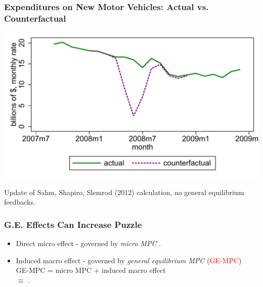 \documentclass[english,xcolor=svgnames]{beamer}
\begin{document}
\begin{frame}{}
\frametitle{Expenditures on New Motor Vehicles: Actual vs. Counterfactual}

\begin{center}
\includegraphics[scale=.6]{figures/fig_sss_mv_counter.pdf}
 \end{center} 
{\footnotesize Update of Sahm, Shapiro, Slemrod (2012) calculation, no general equilibrium feedbacks.}
\end{frame}

\begin{frame}
\frametitle[alignment=center]{G.E. Effects Can Increase Puzzle }
\begin{itemize}

	\item Direct micro effect - governed by \textit{micro MPC} .
\item Induced macro effect - governed by \textit{general equilibrium MPC} (\textcolor{red}{GE-MPC}) \hspace{.05in} \\ \vspace{.2in}
\indent GE-MPC \hspace{.05in} = \hspace{.05in} micro MPC \hspace{.05in} + \hspace{.05in} induced macro effect \hspace{.05in} \\ \medskip
\indent \hspace{0.62in}  $\equiv$ \hspace{.05in} .


\end{itemize}



\end{frame}
\end{document}
